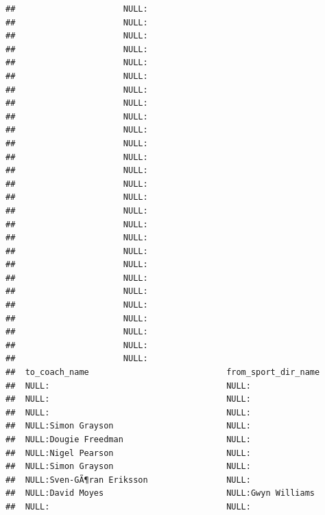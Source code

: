 \documentclass{article}\usepackage[]{graphicx}\usepackage[]{color}
\makeatletter
\newenvironment{kframe}{%
 \def\at@end@of@kframe{}%
 \ifinner\ifhmode%
  \def\at@end@of@kframe{\end{minipage}}%
  \begin{minipage}{\columnwidth}%
 \fi\fi%
 \def\FrameCommand##1{\hskip\@totalleftmargin \hskip-\fboxsep
 \colorbox{shadecolor}{##1}\hskip-\fboxsep
     \hskip-\linewidth \hskip-\@totalleftmargin \hskip\columnwidth}%
 \MakeFramed {\advance\hsize-\width
   \@totalleftmargin\z@ \linewidth\hsize
   \@setminipage}}%
 {\par\unskip\endMakeFramed%
 \at@end@of@kframe}
\newenvironment{knitrout}{}{} %
\makeatother
\begin{document}
\begin{knitrout}
\begin{kframe}
\begin{verbatim}
##                      NULL:                                   
##                      NULL:                                   
##                      NULL:                                   
##                      NULL:                                   
##                      NULL:                                   
##                      NULL:                                   
##                      NULL:                                   
##                      NULL:                                   
##                      NULL:                                   
##                      NULL:                                   
##                      NULL:                                   
##                      NULL:                                   
##                      NULL:                                   
##                      NULL:                                   
##                      NULL:                                   
##                      NULL:                                   
##                      NULL:                                   
##                      NULL:                                   
##                      NULL:                                   
##                      NULL:                                   
##                      NULL:                                   
##                      NULL:                                   
##                      NULL:                                   
##                      NULL:                                   
##                      NULL:                                   
##                      NULL:                                   
##                      NULL:                                   
##  to_coach_name                            from_sport_dir_name                   
##  NULL:                                    NULL:                                 
##  NULL:                                    NULL:                                 
##  NULL:                                    NULL:                                 
##  NULL:Simon Grayson                       NULL:                                 
##  NULL:Dougie Freedman                     NULL:                                 
##  NULL:Nigel Pearson                       NULL:                                 
##  NULL:Simon Grayson                       NULL:                                 
##  NULL:Sven-GÃ¶ran Eriksson                NULL:                                 
##  NULL:David Moyes                         NULL:Gwyn Williams                    
##  NULL:                                    NULL:                                 

\end{verbatim}
\end{kframe}
\end{knitrout}
\end{document}
